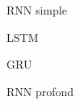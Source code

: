 \begin{frame}{RNN simple}
\end{frame}

\begin{frame}{LSTM}
\end{frame}

\begin{frame}{GRU}
\end{frame}

\begin{frame}{RNN profond}
\end{frame}
